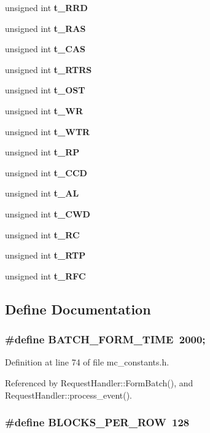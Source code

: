 \begin{CompactItemize}
\item 
unsigned int {\bf t\_\-RRD}
\item 
unsigned int {\bf t\_\-RAS}
\item 
unsigned int {\bf t\_\-CAS}
\item 
unsigned int {\bf t\_\-RTRS}
\item 
unsigned int {\bf t\_\-OST}
\item 
unsigned int {\bf t\_\-WR}
\item 
unsigned int {\bf t\_\-WTR}
\item 
unsigned int {\bf t\_\-RP}
\item 
unsigned int {\bf t\_\-CCD}
\item 
unsigned int {\bf t\_\-AL}
\item 
unsigned int {\bf t\_\-CWD}
\item 
unsigned int {\bf t\_\-RC}
\item 
unsigned int {\bf t\_\-RTP}
\item 
unsigned int {\bf t\_\-RFC}
\end{CompactItemize}


\subsection{Define Documentation}
\subsubsection[{BATCH\_\-FORM\_\-TIME}]{\setlength{\rightskip}{0pt plus 5cm}\#define {\bf BATCH\_\-FORM\_\-TIME}~2000;}\label{mc__constants_8h_e7e3459c7023f3a7dcd68b382db8da3d}




Definition at line 74 of file mc\_\-constants.h.

Referenced by RequestHandler::FormBatch(), and RequestHandler::process\_\-event().
\subsubsection[{BLOCKS\_\-PER\_\-ROW}]{\setlength{\rightskip}{0pt plus 5cm}\#define {\bf BLOCKS\_\-PER\_\-ROW}~128}\label{mc__constants_8h_049e7586f4dee8bf82b0db100e1c36d4}




